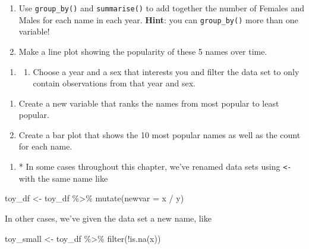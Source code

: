 \documentclass[
]{book}
\newenvironment{Shaded}{\begin{snugshade}}{\end{snugshade}}
\newcommand{\AttributeTok}[1]{\textcolor[rgb]{0.77,0.63,0.00}{#1}}
\newcommand{\FunctionTok}[1]{\textcolor[rgb]{0.00,0.00,0.00}{#1}}
\newcommand{\NormalTok}[1]{#1}
\newcommand{\OtherTok}[1]{\textcolor[rgb]{0.56,0.35,0.01}{#1}}
\newcommand{\SpecialCharTok}[1]{\textcolor[rgb]{0.00,0.00,0.00}{#1}}
\providecommand{\tightlist}{%
  \setlength{\itemsep}{0pt}\setlength{\parskip}{0pt}}
\begin{document}
\begin{enumerate}
\def\labelenumi{\alph{enumi}.}
\setcounter{enumi}{1}
\item
  Use \texttt{group\_by()} and \texttt{summarise()} to add together the number of Females and Males for each name in each year. \textbf{Hint}: you can \texttt{group\_by()} more than one variable!
\item
  Make a line plot showing the popularity of these 5 names over time.
\end{enumerate}

\begin{enumerate}
\def\labelenumi{\arabic{enumi}.}
\setcounter{enumi}{2}
\item
  \begin{enumerate}
  \def\labelenumii{\alph{enumii}.}
  \tightlist
  \item
    Choose a year and a sex that interests you and filter the data set to only contain observations from that year and sex.
  \end{enumerate}
\end{enumerate}

\begin{enumerate}
\def\labelenumi{\alph{enumi}.}
\setcounter{enumi}{1}
\item
  Create a new variable that ranks the names from most popular to least popular.
\item
  Create a bar plot that shows the 10 most popular names as well as the count for each name.
\end{enumerate}

\begin{enumerate}
\def\labelenumi{\arabic{enumi}.}
\setcounter{enumi}{3}
\tightlist
\item
  * In some cases throughout this chapter, we've renamed data sets using \texttt{\textless{}-} with the same name like
\end{enumerate}

\begin{Shaded}
\begin{Highlighting}[]
\NormalTok{toy\_df }\OtherTok{\textless{}{-}}\NormalTok{ toy\_df }\SpecialCharTok{\%\textgreater{}\%} \FunctionTok{mutate}\NormalTok{(}\AttributeTok{newvar =}\NormalTok{ x }\SpecialCharTok{/}\NormalTok{ y)}
\end{Highlighting}
\end{Shaded}

In other cases, we've given the data set a new name, like

\begin{Shaded}
\begin{Highlighting}[]
\NormalTok{toy\_small }\OtherTok{\textless{}{-}}\NormalTok{ toy\_df }\SpecialCharTok{\%\textgreater{}\%} \FunctionTok{filter}\NormalTok{(}\SpecialCharTok{!}\FunctionTok{is.na}\NormalTok{(x))}
\end{Highlighting}
\end{Shaded}
\end{document}

